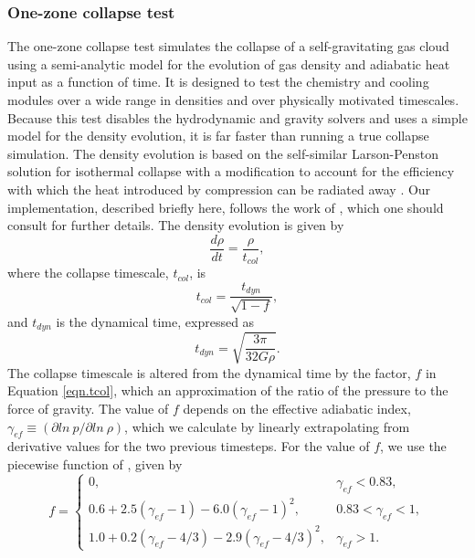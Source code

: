 \subsubsection{One-zone collapse test}
\label{sec.tests.1-zone}
The one-zone collapse test simulates the collapse of a
self-gravitating gas cloud using a semi-analytic model for the
evolution of gas density and adiabatic heat input as a function of
time.  It is designed to test the chemistry and cooling modules over a
wide range in densities and over physically motivated timescales.
Because this test disables the hydrodynamic and gravity solvers and
uses a simple model for the density evolution, it is far faster than
running a true collapse simulation.  The density evolution is based on
the self-similar Larson-Penston \citep{1969MNRAS.145..271L,
  1969MNRAS.144..425P} solution for isothermal collapse with a
modification to account for the efficiency with which the heat
introduced by compression can be radiated away
\citep{1983ApJ...265.1047Y}.  Our implementation, described briefly
here, follows the work of \citet{2005ApJ...626..627O}, which one
should consult for further details.  The density evolution is given by 
\begin{equation}
\frac{d\rho}{dt} = \frac{\rho}{t_{col}},
\end{equation}
where the collapse timescale, $t_{col}$, is
\begin{equation} \label{eqn.tcol}
t_{col} = \frac{t_{dyn}}{\sqrt{1 - f}},
\end{equation}
and $t_{dyn}$ is the dynamical time, expressed as
\begin{equation}
t_{dyn} = \sqrt{\frac{3 \pi}{32 G \rho}}.
\end{equation}
The collapse timescale is altered from the dynamical time by the
factor, $f$ in Equation \ref{eqn.tcol}, which an approximation of the
ratio of the pressure to the force of gravity.  The value of $f$
depends on the effective adiabatic index, $\gamma_{ef} \equiv (\partial
ln\ p / \partial ln\ \rho)$, which we calculate by linearly extrapolating
from derivative values for the two previous timesteps.  For the value
of $f$, we use the piecewise function of \citet{2005ApJ...626..627O},
given by
\begin{equation}
f = \left\{
  \begin{array}{ll}
  0, & \gamma_{ef} < 0.83,\\
  0.6 + 2.5 (\gamma_{ef} - 1) - 6.0 (\gamma_{ef} - 1)^{2}, & 0.83 <
  \gamma_{ef} < 1,\\
  1.0 + 0.2 (\gamma_{ef} - 4/3) - 2.9 (\gamma_{ef} - 4/3)^{2}, & \gamma_{ef} > 1.
\end{array} \right.
\end{equation}
